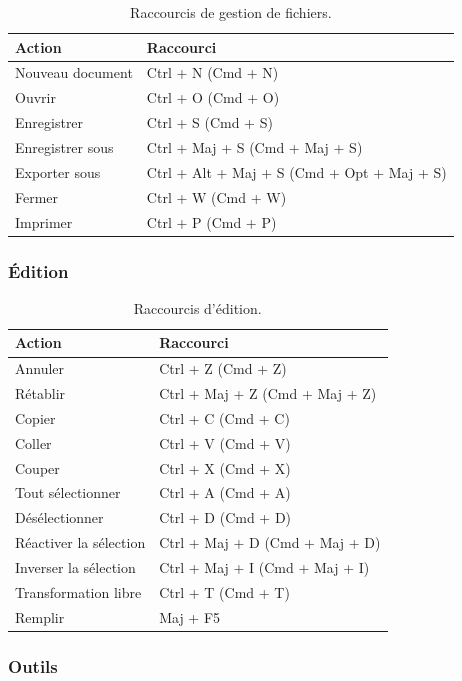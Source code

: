 \begin{table}[h!]
\centering
\begin{tabular}{@{}ll@{}}
\toprule
\textbf{Action} & \textbf{Raccourci} \\
\midrule
Nouveau document & Ctrl + N (Cmd + N) \\
Ouvrir & Ctrl + O (Cmd + O) \\
Enregistrer & Ctrl + S (Cmd + S) \\
Enregistrer sous & Ctrl + Maj + S (Cmd + Maj + S) \\
Exporter sous & Ctrl + Alt + Maj + S (Cmd + Opt + Maj + S) \\
Fermer & Ctrl + W (Cmd + W) \\
Imprimer & Ctrl + P (Cmd + P) \\
\bottomrule
\end{tabular}
\caption{Raccourcis de gestion de fichiers.}
\end{table}

\subsubsection{Édition}

\begin{table}[h!]
\centering
\begin{tabular}{@{}ll@{}}
\toprule
\textbf{Action} & \textbf{Raccourci} \\
\midrule
Annuler & Ctrl + Z (Cmd + Z) \\
Rétablir & Ctrl + Maj + Z (Cmd + Maj + Z) \\
Copier & Ctrl + C (Cmd + C) \\
Coller & Ctrl + V (Cmd + V) \\
Couper & Ctrl + X (Cmd + X) \\
Tout sélectionner & Ctrl + A (Cmd + A) \\
Désélectionner & Ctrl + D (Cmd + D) \\
Réactiver la sélection & Ctrl + Maj + D (Cmd + Maj + D) \\
Inverser la sélection & Ctrl + Maj + I (Cmd + Maj + I) \\
Transformation libre & Ctrl + T (Cmd + T) \\
Remplir & Maj + F5 \\
\bottomrule
\end{tabular}
\caption{Raccourcis d'édition.}
\end{table}

\subsubsection{Outils}

